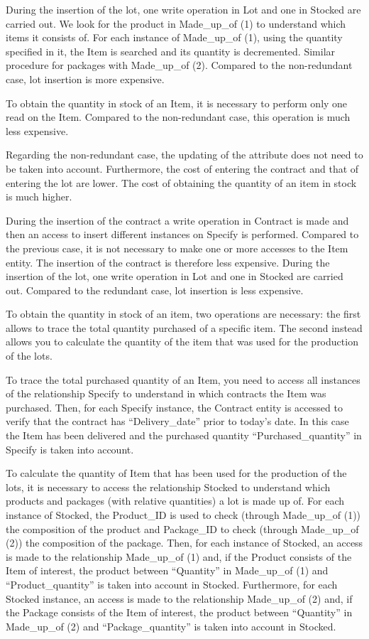 During the insertion of the lot, one write operation in Lot and one in Stocked are carried out. We look for the product in Made\_up\_of (1) to understand which items it consists of. For each instance of Made\_up\_of (1), using the quantity specified in it, the Item is searched and its quantity is decremented. Similar procedure for packages with Made\_up\_of (2). Compared to the non-redundant case, lot insertion is more expensive.

To obtain the quantity in stock of an Item, it is necessary to perform only one read on the Item. Compared to the non-redundant case, this operation is much less expensive.

Regarding the non-redundant case, the updating of the attribute does not need to be taken into account. Furthermore, the cost of entering the contract and that of entering the lot are lower. The cost of obtaining the quantity of an item in stock is much higher.

During the insertion of the contract a write operation in Contract is made and then an access to insert different instances on Specify is performed. Compared to the previous case, it is not necessary to make one or more accesses to the Item entity. The insertion of the contract is therefore less expensive.
During the insertion of the lot, one write operation in Lot and one in Stocked are carried out. Compared to the redundant case, lot insertion is less expensive.

To obtain the quantity in stock of an item, two operations are necessary: the first allows to trace the total quantity purchased of a specific item. The second instead allows you to calculate the quantity of the item that was used for the production of the lots.

To trace the total purchased quantity of an Item, you need to access all instances of the relationship Specify to understand in which contracts the Item was purchased. Then, for each Specify instance, the Contract entity is accessed to verify that the contract has ``Delivery\_date'' prior to today's date. In this case the Item has been delivered and the purchased quantity ``Purchased\_quantity'' in Specify is taken into account.

To calculate the quantity of Item that has been used for the production of the lots, it is necessary to access the relationship Stocked to understand which products and packages (with relative quantities) a lot is made up of. For each instance of Stocked, the Product\_ID is used to check (through Made\_up\_of (1)) the composition of the product and Package\_ID to check (through Made\_up\_of (2)) the composition of the package. Then, for each instance of Stocked, an access is made to the relationship Made\_up\_of (1) and, if the Product consists of the Item of interest, the product between ``Quantity'' in Made\_up\_of (1) and ``Product\_quantity'' is taken into account in Stocked. Furthermore, for each Stocked instance, an access is made to the relationship Made\_up\_of (2) and, if the Package consists of the Item of interest, the product between ``Quantity'' in Made\_up\_of (2) and ``Package\_quantity'' is taken into account in Stocked.

